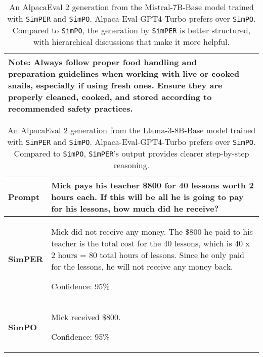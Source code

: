 \begin{table}[!h]
\begin{tabular}{lp{11.5cm}}
Note: Always follow proper food handling and preparation guidelines when working with live or cooked snails, especially if using fresh ones. Ensure they are properly cleaned, cooked, and stored according to recommended safety practices. \\
\bottomrule[1pt]
    \end{tabular}
    \caption{An AlpacaEval 2 generation from the Mistral-7B-Base model trained with \texttt{SimPER} and \texttt{SimPO}. Alpaca-Eval-GPT4-Turbo prefers \method over \texttt{SimPO}. Compared to \texttt{SimPO}, the generation by \texttt{SimPER} is better structured, with hierarchical discussions that make it more helpful.}
    \label{tab:case-2}
\end{table}

\begin{table}[!h]
    \centering
        \ttfamily
        \small
    \begin{tabular}{lp{11.5cm}}
        \toprule[1pt]
        \bf{Prompt} & Mick pays his teacher \$800 for 40 lessons worth 2 hours each. If this will be all he is going to pay for his lessons, how much did he receive?\\
        \midrule
        \bf{SimPER} & Mick did not receive any money. The \$800 he paid to his teacher is the total cost for the 40 lessons, which is 40 x 2 hours = 80 total hours of lessons. Since he only paid for the lessons, he will not receive any money back.
        
        Confidence: 95\% \\
        \midrule
        \bf{SimPO} & Mick received \$800.
        
        Confidence: 95\%\\
        \bottomrule[1pt]
    \end{tabular}
    \caption{An AlpacaEval 2 generation from the Llama-3-8B-Base model trained with \texttt{SimPER} and \texttt{SimPO}. Alpaca-Eval-GPT4-Turbo prefers \method over \texttt{SimPO}. Compared to \texttt{SimPO}, \texttt{SimPER}'s output provides clearer step-by-step reasoning.}
    \label{tab:case-3}
\end{table}

